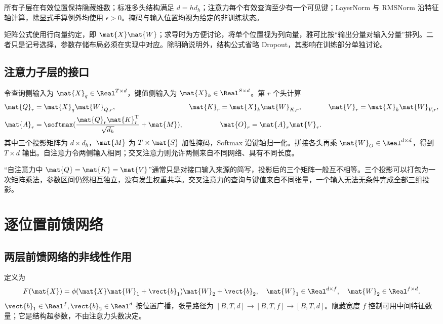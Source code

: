 \documentclass[../textbook.tex]{subfiles}
\begin{document}
\begin{assumption}[结构推导的共同假设]
所有子层在有效位置保持隐藏维数；标准多头结构满足 $d=hd_h$；注意力每个有效查询至少有一个可见键；LayerNorm 与 RMSNorm 沿特征轴计算，除显式手算例外均使用 $\epsilon>0$。掩码与输入位置均视为给定的非训练状态。
\end{assumption}

矩阵公式使用行向量约定，即 $\mat{X}\mat{W}$；求导时为方便讨论，将单个位置视为列向量，雅可比按“输出分量对输入分量”排列。二者只是记号选择，参数存储布局必须在实现中对应。除明确说明外，结构公式省略 Dropout，其影响在训练部分单独讨论。

\subsection{注意力子层的接口}
令查询侧输入为 $\mat{X}_q\in\Real^{T\times d}$，键值侧输入为 $\mat{X}_k\in\Real^{S\times d}$。第 $r$ 个头计算
\begin{align}
 \mat{Q}_r&=\mat{X}_q\mat{W}_{Q,r},&\mat{K}_r&=\mat{X}_k\mat{W}_{K,r},&\mat{V}_r&=\mat{X}_k\mat{W}_{V,r},\\
 \mat{A}_r&=\softmax(\frac{\mat{Q}_r\mat{K}_r^{\mathrm{T}}}{\sqrt{d_h}}+\mat{M}),&&
 \mat{O}_r=\mat{A}_r\mat{V}_r.
\end{align}
其中三个投影矩阵为 $d\times d_h$，$\mat{M}$ 为 $T\times \mat{S}$ 加性掩码，Softmax 沿键轴归一化。拼接各头再乘 $\mat{W}_O\in\Real^{d\times d}$，得到 $T\times d$ 输出。自注意力令两侧输入相同；交叉注意力则允许两侧来自不同网络、具有不同长度。

“自注意力中 $\mat{Q}=\mat{K}=\mat{V}$”通常只是对接口输入来源的简写，投影后的三个矩阵一般互不相等。三个投影可以打包为一次矩阵乘法，参数区间仍然相互独立，没有发生权重共享。交叉注意力的查询与键值来自不同张量，一个输入无法无条件完成全部三组投影。

\section{逐位置前馈网络}

\subsection{两层前馈网络的非线性作用}
定义为
\begin{equation}\label{eq:tr-ffn}
 F(\mat{X})=\phi(\mat{X}\mat{W}_1+\vect{b}_1)\mat{W}_2+\vect{b}_2,
 \quad \mat{W}_1\in\Real^{d\times f},\quad \mat{W}_2\in\Real^{f\times d}.
\end{equation}
$\vect{b}_1\in\Real^f,\vect{b}_2\in\Real^d$ 按位置广播，张量路径为 $[B,T,d]\to[B,T,f]\to[B,T,d]$。隐藏宽度 $f$ 控制可用中间特征数量；它是结构超参数，不由注意力头数决定。
\end{document}

